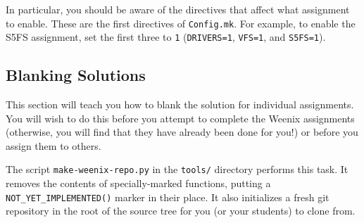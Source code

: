 In particular, you should be aware of the directives that affect what assignment to enable.  These are the first directives of \texttt{Config.mk}.  For example, to enable the S5FS assignment, set the first three to \texttt{1} (\texttt{DRIVERS=1}, \texttt{VFS=1}, and \texttt{S5FS=1}).

\subsection{Blanking Solutions}

This section will teach you how to blank the solution for individual assignments.  You will wish to do this before you attempt to complete the Weenix assignments (otherwise, you will find that they have already been done for you!) or before you assign them to others.

The script \texttt{make-weenix-repo.py} in the \texttt{tools/} directory performs this task.  It removes the contents of specially-marked functions, putting a \texttt{NOT\_YET\_IMPLEMENTED()} marker in their place.  It also initializes a fresh git repository in the root of the source tree for you (or your students) to clone from.

